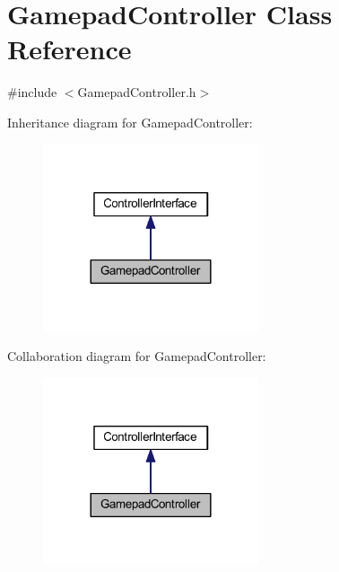 \hypertarget{class_gamepad_controller}{
\section{GamepadController Class Reference}
\label{d3/dbd/class_gamepad_controller}
}


{\ttfamily \#include $<$GamepadController.h$>$}



Inheritance diagram for GamepadController:
\nopagebreak
\begin{figure}[H]
\begin{center}
\leavevmode
\includegraphics[width=180pt]{d3/d01/class_gamepad_controller__inherit__graph}
\end{center}
\end{figure}


Collaboration diagram for GamepadController:
\nopagebreak
\begin{figure}[H]
\begin{center}
\leavevmode
\includegraphics[width=180pt]{d3/d5e/class_gamepad_controller__coll__graph}
\end{center}
\end{figure}
